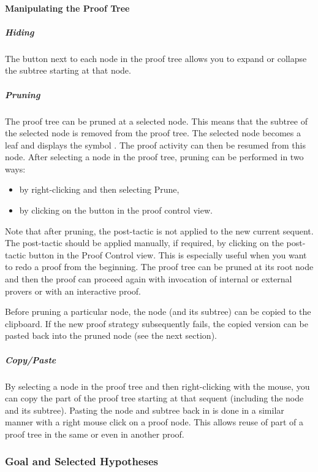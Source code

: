 \paragraph{Manipulating the Proof Tree}

\subparagraph{Hiding}

The button next to each node in the proof tree allows you to expand or collapse the subtree starting at that node. 

\subparagraph{Pruning}

The proof tree can be pruned at a selected node. This means that the subtree of the selected node is removed from the proof tree. The selected node becomes a leaf and displays the symbol . The proof activity can then be resumed from this node. After selecting a node in the proof tree, pruning can be performed in two ways:

\begin{itemize}
	\item by right-clicking and then selecting \textsf{Prune},
	\item by clicking on the  button in the proof control view. 
\end{itemize}

Note that after pruning, the post-tactic is not applied to the new current sequent. The post-tactic should be applied manually, if required, by clicking on the post-tactic button in the Proof Control view. This is especially useful when you want to redo a proof from the beginning. The proof tree can be pruned at its root node and then the proof can proceed again with invocation of internal or external provers or with an interactive proof.

Before pruning a particular node, the node (and its subtree) can be copied to the clipboard. If the new proof strategy subsequently fails, the copied version can be pasted back into the pruned node (see the next section). 

\subparagraph{Copy/Paste}

By selecting a node in the proof tree and then right-clicking with the mouse, you can copy the part of the proof tree starting at that sequent (including the node and its subtree). Pasting the node and subtree back in is done in a similar manner with a right mouse click on a proof node. This allows reuse of part of a proof tree in the same or even in another proof.

\subsubsection{Goal and Selected Hypotheses}
\label{goal_view}

